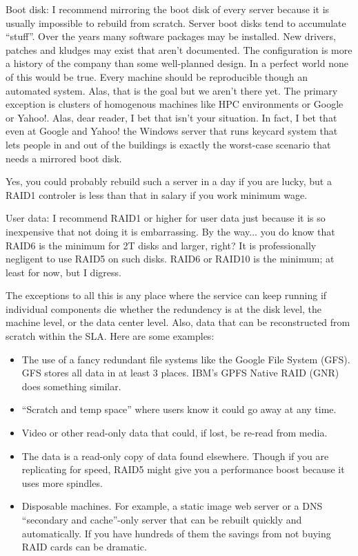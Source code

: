 \documentclass{article}
\begin{document}
Boot disk: I recommend mirroring the boot disk of every server because it is usually impossible to rebuild from scratch. Server boot disks tend to accumulate ``stuff''. Over the years many software packages may be installed. New drivers, patches and kludges may exist that aren't documented. The configuration is more a history of the company than some well-planned design. In a perfect world none of this would be true. Every machine should be reproducible though an automated system. Alas, that is the goal but we aren't there yet. The primary exception is clusters of homogenous machines like HPC environments or Google or Yahoo!. Alas, dear reader, I bet that isn't your situation. In fact, I bet that even at Google and Yahoo! the Windows server that runs keycard system that lets people in and out of the buildings is exactly the worst-case scenario that needs a mirrored boot disk.

Yes, you could probably rebuild such a server in a day if you are lucky, but a RAID1 controler is less than that in salary if you work minimum wage.

User data: I recommend RAID1 or higher for user data just because it is so inexpensive that not doing it is embarrassing. By the way... you do know that RAID6 is the minimum for 2T disks and larger, right? It is professionally negligent to use RAID5 on such disks. RAID6 or RAID10 is the minimum; at least for now, but I digress.

The exceptions to all this is any place where the service can keep running if individual components die whether the redundency is at the disk level, the machine level, or the data center level. Also, data that can be reconstructed from scratch within the SLA. Here are some examples:

\begin{itemize}
    \item The use of a fancy redundant file systems like the Google File System (GFS). GFS stores all data in at least 3 places. IBM's GPFS Native RAID (GNR) does something similar.
    \item ``Scratch and temp space'' where users know it could go away at any time.
    \item Video or other read-only data that could, if lost, be re-read from media.
    \item The data is a read-only copy of data found elsewhere. Though if you are replicating for speed, RAID5 might give you a performance boost because it uses more spindles.
    \item Disposable machines. For example, a static image web server or a DNS ``secondary and cache''-only server that can be rebuilt quickly and automatically. If you have hundreds of them the savings from not buying RAID cards can be dramatic.
\end{itemize}
\end{document}
